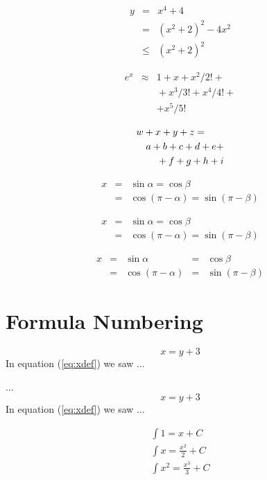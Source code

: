 \documentclass{article}
\begin{document}
\begin{eqnarray}
 y &=& x^4 + 4      \nonumber \\
   &=& (x^2+2)^2 -4x^2 \nonumber \\
   &\le&(x^2+2)^2
\end{eqnarray}

\begin{eqnarray*}
 e^x &\approx& 1+x+x^2/2! + \\
   && {}+x^3/3! + x^4/4! + \\
   && + x^5/5!
\end{eqnarray*}

\begin{eqnarray*}
 \lefteqn{w+x+y+z = }\\
   && a+b+c+d+e+\\
   && {}+f+g+h+i
\end{eqnarray*}

\begin{eqnarray*}
 x&=&\sin \alpha = \cos \beta\\
  &=&\cos(\pi-\alpha) = \sin(\pi-\beta)
\end{eqnarray*}

{\begin{eqnarray*}
  x&=&\sin \alpha = \cos \beta\\
   &=&\cos(\pi-\alpha) = \sin(\pi-\beta)
 \end{eqnarray*}
}

$$
 \begin{array}{rclcl}
  x&=&\sin \alpha &=& \cos \beta\\
   &=&\cos(\pi-\alpha) &=& \sin(\pi-\beta)
 \end{array}
$$

\section{Formula Numbering}

\begin{equation} x=y+3 \label{eq:xdef}
\end{equation}
In equation (\ref{eq:xdef}) we saw $\dots$


...
\begin{equation} x=y+3 \label{eq:xdef}
\end{equation}
In equation (\ref{eq:xdef}) we saw $\dots$

\begin{equation}
\begin{array}{l}
\displaystyle \int 1 = x + C\\
\displaystyle \int x = \frac{x^2}{2} + C \\
\displaystyle \int x^2 = \frac{x^3}{3} + C
\end{array} 
\label{eq:xdef}
\end{equation}
\end{document}
